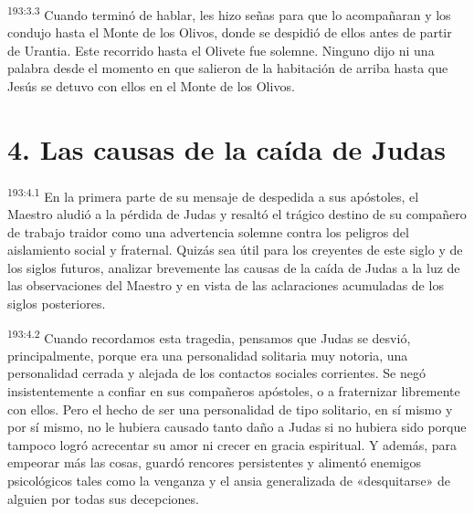 \par 
\textsuperscript{193:3.3} Cuando terminó de hablar, les hizo señas para que lo acompañaran y los condujo hasta el Monte de los Olivos, donde se despidió de ellos antes de partir de Urantia. Este recorrido hasta el Olivete fue solemne. Ninguno dijo ni una palabra desde el momento en que salieron de la habitación de arriba hasta que Jesús se detuvo con ellos en el Monte de los Olivos.

\section*{4. Las causas de la caída de Judas}
\par 
\textsuperscript{193:4.1} En la primera parte de su mensaje de despedida a sus apóstoles, el Maestro aludió a la pérdida de Judas y resaltó el trágico destino de su compañero de trabajo traidor como una advertencia solemne contra los peligros del aislamiento social y fraternal. Quizás sea útil para los creyentes de este siglo y de los siglos futuros, analizar brevemente las causas de la caída de Judas a la luz de las observaciones del Maestro y en vista de las aclaraciones acumuladas de los siglos posteriores.

\par 
\textsuperscript{193:4.2} Cuando recordamos esta tragedia, pensamos que Judas se desvió, principalmente, porque era una personalidad solitaria muy notoria, una personalidad cerrada y alejada de los contactos sociales corrientes. Se negó insistentemente a confiar en sus compañeros apóstoles, o a fraternizar libremente con ellos. Pero el hecho de ser una personalidad de tipo solitario, en sí mismo y por sí mismo, no le hubiera causado tanto daño a Judas si no hubiera sido porque tampoco logró acrecentar su amor ni crecer en gracia espiritual. Y además, para empeorar más las cosas, guardó rencores persistentes y alimentó enemigos psicológicos tales como la venganza y el ansia generalizada de «desquitarse» de alguien por todas sus decepciones.

